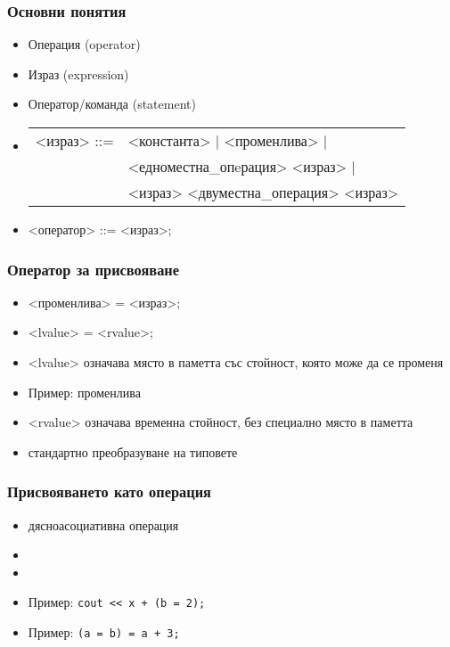 \documentclass{beamer}
\begin{document}
\begin{frame}
  \frametitle{Основни понятия}

  \begin{itemize}
  \item Операция (operator)
  \item Израз (expression)
  \item Оператор/команда (statement)
  \item{}
    \begin{tabular}[t]{@{}rl@{}}
      <израз> ::= &<константа> | <променлива> |\\
      &<едноместна\_опeрация> <израз> |\\
      &<израз> <двуместна\_операция> <израз>
    \end{tabular}
  \item{} <оператор> ::= <израз>\tta;
  \end{itemize}
\end{frame}

\begin{frame}
  \frametitle{Оператор за присвояване}

  \begin{itemize}
  \item{} <променлива> \tta= <израз>\tta;
  \item{} <lvalue> \tta= <rvalue>\tta;
  \item{} <lvalue> означава място в паметта със стойност, която може да
    се променя
  \item Пример: променлива
  \item{} <rvalue> означава временна стойност, без специално място в
    паметта
  \item стандартно преобразуване на типовете
  \end{itemize}

\end{frame}

\begin{frame}[<1-3>]
  \frametitle{Присвояването като операция}
  \begin{itemize}
  \item<1-> \alert{дясноасоциативна} операция
  \item<2-> 
  \item<3> 
  \item<5-> Пример: \lstinline{cout << x + (b = 2);}
  \item<6-> Пример: \lstinline{(a = b) = a + 3;}
  \end{itemize}
\end{frame}
\end{document}
